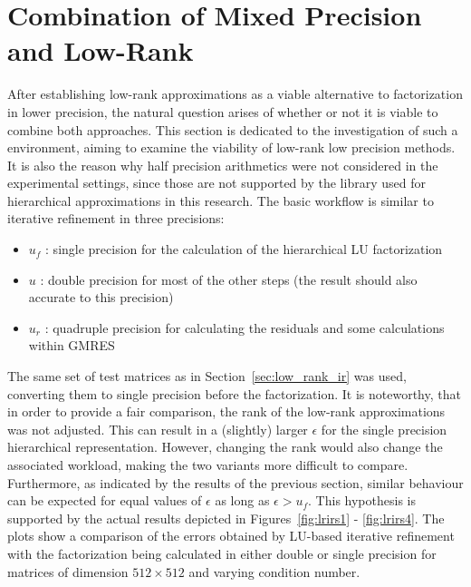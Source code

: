 \section{Combination of Mixed Precision and Low-Rank}
\label{sec:combination}

After establishing low-rank approximations as a viable alternative to factorization in lower precision, the natural question arises of whether or not it is viable to combine both approaches. This section is dedicated to the investigation of such a environment, aiming to examine the viability of low-rank low precision methods. It is also the reason why half precision arithmetics were not considered in the experimental settings, since those are not supported by the library used for hierarchical approximations in this research. The basic workflow is similar to iterative refinement in three precisions:
\begin{itemize}
    \item $u_f$ : single precision for the calculation of the hierarchical LU factorization
     \item $u$ : double precision for most of the other steps (the result should also accurate to this precision)
     \item $u_r$ : quadruple precision for calculating the residuals and some calculations within GMRES
\end{itemize}

\noindent The same set of test matrices as in Section~\hyperref[sec:low_rank_ir]{\ref{sec:low_rank_ir}} was used, converting them to single precision before the factorization. It is noteworthy, that in order to provide a fair comparison, the rank of the low-rank approximations was not adjusted. This can result in a (slightly) larger $\epsilon$ for the single precision hierarchical representation. However, changing the rank would also change the associated workload, making the two variants more difficult to compare. Furthermore, as indicated by the results of the previous section, similar behaviour can be expected for equal values of $\epsilon$ as long as $\epsilon > u_f$. This hypothesis is supported by the actual results depicted in Figures~\hyperref[fig:lrirs1]{\ref{fig:lrirs1}} - \hyperref[fig:lrirs4]{\ref{fig:lrirs4}}. The plots show a comparison of the errors obtained by LU-based iterative refinement with the factorization being calculated in either double or single precision for matrices of dimension $512 \times 512$ and varying condition number.

